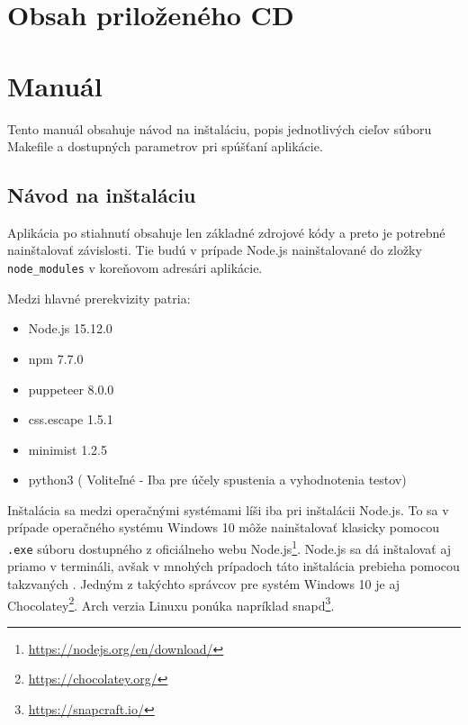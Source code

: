 \chapter{Obsah priloženého CD}


\chapter{Manuál}
\label{manual}

Tento manuál obsahuje návod na inštaláciu, popis jednotlivých cieľov súboru Makefile a dostupných parametrov pri spúšťaní aplikácie.

\section{Návod na inštaláciu}

Aplikácia po stiahnutí obsahuje len základné zdrojové kódy a preto je potrebné nainštalovať závislosti. Tie budú v prípade Node.js nainštalované do zložky \texttt{node\_modules} v koreňovom adresári aplikácie.

Medzi hlavné prerekvizity patria:

\begin{itemize}
    \item Node.js 15.12.0
    \item npm 7.7.0
    \item puppeteer 8.0.0
    \item css.escape 1.5.1
    \item minimist 1.2.5
    \item python3 ( Voliteľné - Iba pre účely spustenia a vyhodnotenia testov)
\end{itemize}

Inštalácia sa medzi operačnými systémami líši iba pri inštalácii Node.js. To sa v prípade operačného systému Windows 10 môže nainštalovať klasicky pomocou \texttt{.exe} súboru dostupného z oficiálneho webu Node.js\footnote{\url{https://nodejs.org/en/download/}}. Node.js sa dá inštalovať aj priamo v termináli, avšak v mnohých prípadoch táto inštalácia prebieha pomocou takzvaných . Jedným z takýchto správcov pre systém Windows 10 je aj Chocolatey\footnote{\url{https://chocolatey.org/}}. Arch verzia Linuxu ponúka napríklad snapd\footnote{\url{https://snapcraft.io/}}. 

